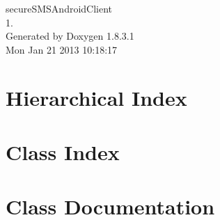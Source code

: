 \documentclass{book}
\begin{document}
\hypersetup{pageanchor=false,citecolor=blue}
\begin{titlepage}
\vspace*{7cm}
\begin{center}
{\Large secure\-S\-M\-S\-Android\-Client \\[1ex]\large 1. }\\
\vspace*{1cm}
{\large Generated by Doxygen 1.8.3.1}\\
\vspace*{0.5cm}
{\small Mon Jan 21 2013 10:18:17}\\
\end{center}
\end{titlepage}
\clearemptydoublepage
{}
\tableofcontents
\clearemptydoublepage
{}
\hypersetup{pageanchor=true,citecolor=blue}
\chapter{Hierarchical Index}

\chapter{Class Index}

\chapter{Class Documentation}
















\printindex
\end{document}
